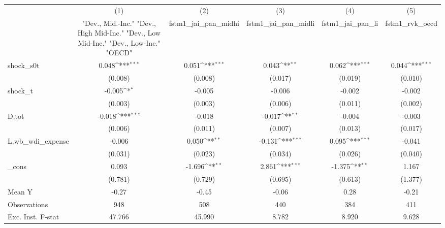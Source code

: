 {
\def\sym#1{\ifmmode^{#1}\else\(^{#1}\)\fi}
\begin{tabular}{l*{5}{c}}
\toprule
            &\multicolumn{1}{c}{(1)}&\multicolumn{1}{c}{(2)}&\multicolumn{1}{c}{(3)}&\multicolumn{1}{c}{(4)}&\multicolumn{1}{c}{(5)}\\
            &\multicolumn{1}{c}{ "Dev., Mid.-Inc." "Dev., High Mid-Inc." "Dev., Low Mid-Inc." "Dev., Low-Inc." "OECD" }&\multicolumn{1}{c}{fstm1\_jai\_pan\_midhi}&\multicolumn{1}{c}{fstm1\_jai\_pan\_midli}&\multicolumn{1}{c}{fstm1\_jai\_pan\_li}&\multicolumn{1}{c}{fstm1\_rvk\_oecd}\\
\midrule
shock\_s0t   &       0.048\sym{***}&       0.051\sym{***}&       0.043\sym{**} &       0.062\sym{***}&       0.044\sym{***}\\
            &     (0.008)         &     (0.008)         &     (0.017)         &     (0.019)         &     (0.010)         \\
\addlinespace
shock\_t     &      -0.005\sym{*}  &      -0.005         &      -0.006         &      -0.002         &      -0.002         \\
            &     (0.003)         &     (0.003)         &     (0.006)         &     (0.011)         &     (0.002)         \\
\addlinespace
D.tot       &      -0.018\sym{***}&      -0.018         &      -0.017\sym{**} &      -0.004         &      -0.003         \\
            &     (0.006)         &     (0.011)         &     (0.007)         &     (0.013)         &     (0.017)         \\
\addlinespace
L.wb\_wdi\_expense&      -0.006         &       0.050\sym{**} &      -0.131\sym{***}&       0.095\sym{***}&      -0.041         \\
            &     (0.031)         &     (0.023)         &     (0.034)         &     (0.026)         &     (0.040)         \\
\addlinespace
\_cons      &       0.093         &      -1.696\sym{**} &       2.861\sym{***}&      -1.375\sym{**} &       1.167         \\
            &     (0.781)         &     (0.729)         &     (0.695)         &     (0.613)         &     (1.377)         \\
\midrule
Mean Y      &       -0.27         &       -0.45         &       -0.06         &        0.28         &       -0.21         \\
Observations&         948         &         508         &         440         &         384         &         411         \\
Exc. Inst. F-stat&      47.766         &      45.990         &       8.782         &       8.920         &       9.628         \\
\bottomrule
\end{tabular}
}
